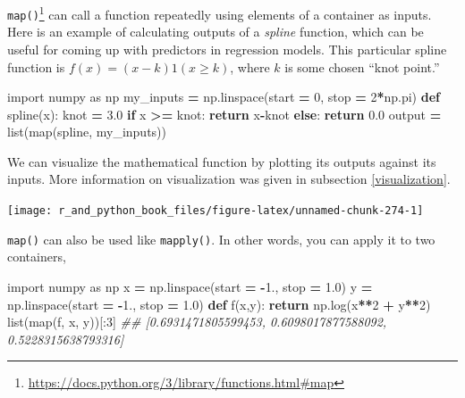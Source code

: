 \documentclass[
  12pt,
  krantz2]{krantz}
\makeatletter
\newenvironment{Shaded}{\begin{snugshade}}{\end{snugshade}}
\newcommand{\BuiltInTok}[1]{#1}
\newcommand{\CommentTok}[1]{\textcolor[rgb]{0.37,0.37,0.37}{\textit{#1}}}
\newcommand{\ControlFlowTok}[1]{\textcolor[rgb]{0.27,0.27,0.27}{\textbf{#1}}}
\newcommand{\DecValTok}[1]{\textcolor[rgb]{0.06,0.06,0.06}{#1}}
\newcommand{\FloatTok}[1]{\textcolor[rgb]{0.06,0.06,0.06}{#1}}
\newcommand{\ImportTok}[1]{#1}
\newcommand{\KeywordTok}[1]{\textcolor[rgb]{0.27,0.27,0.27}{\textbf{#1}}}
\newcommand{\NormalTok}[1]{#1}
\newcommand{\OperatorTok}[1]{\textcolor[rgb]{0.43,0.43,0.43}{\textbf{#1}}}
\renewcommand{\href}[2]{#2\footnote{\url{#1}}}
\newenvironment{kframe}{%
\medskip{}
\setlength{\fboxsep}{.8em}
 \def\at@end@of@kframe{}%
 \ifinner\ifhmode%
  \def\at@end@of@kframe{\end{minipage}}%
  \begin{minipage}{\columnwidth}%
 \fi\fi%
 \def\FrameCommand##1{\hskip\@totalleftmargin \hskip-\fboxsep
 \colorbox{shadecolor}{##1}\hskip-\fboxsep
     \hskip-\linewidth \hskip-\@totalleftmargin \hskip\columnwidth}%
 \MakeFramed {\advance\hsize-\width
   \@totalleftmargin\z@ \linewidth\hsize
   \@setminipage}}%
 {\par\unskip\endMakeFramed%
 \at@end@of@kframe}
\renewenvironment{Shaded}{\begin{kframe}}{\end{kframe}}
\makeatother
\begin{document}
\href{https://docs.python.org/3/library/functions.html\#map}{\texttt{map()}} can call a function repeatedly using elements of a container as inputs. Here is an example of calculating outputs of a \emph{spline} function, which can be useful for coming up with predictors in regression models. This particular spline function is \(f(x) = (x-k)1(x \ge k)\), where \(k\) is some chosen ``knot point.''

\begin{Shaded}
\begin{Highlighting}[]
\ImportTok{import}\NormalTok{ numpy }\ImportTok{as}\NormalTok{ np}
\NormalTok{my\_inputs }\OperatorTok{=}\NormalTok{ np.linspace(start }\OperatorTok{=} \DecValTok{0}\NormalTok{, stop }\OperatorTok{=} \DecValTok{2}\OperatorTok{*}\NormalTok{np.pi)}
\KeywordTok{def}\NormalTok{ spline(x):}
\NormalTok{    knot }\OperatorTok{=} \FloatTok{3.0}
    \ControlFlowTok{if}\NormalTok{ x }\OperatorTok{\textgreater{}=}\NormalTok{ knot:}
        \ControlFlowTok{return}\NormalTok{ x}\OperatorTok{{-}}\NormalTok{knot}
    \ControlFlowTok{else}\NormalTok{:}
        \ControlFlowTok{return} \FloatTok{0.0}
\NormalTok{output }\OperatorTok{=} \BuiltInTok{list}\NormalTok{(}\BuiltInTok{map}\NormalTok{(spline, my\_inputs))}
\end{Highlighting}
\end{Shaded}

We can visualize the mathematical function by plotting its outputs against its inputs. More information on visualization was given in subsection \ref{visualization}.

\texttt{[image: r\_and\_python\_book\_files/figure-latex/unnamed-chunk-274-1]}

\texttt{map()} can also be used like \texttt{mapply()}. In other words, you can apply it to two containers,

\begin{Shaded}
\begin{Highlighting}[]
\ImportTok{import}\NormalTok{ numpy }\ImportTok{as}\NormalTok{ np}
\NormalTok{x }\OperatorTok{=}\NormalTok{ np.linspace(start }\OperatorTok{=} \OperatorTok{{-}}\FloatTok{1.}\NormalTok{, stop }\OperatorTok{=} \FloatTok{1.0}\NormalTok{)}
\NormalTok{y }\OperatorTok{=}\NormalTok{ np.linspace(start }\OperatorTok{=} \OperatorTok{{-}}\FloatTok{1.}\NormalTok{, stop }\OperatorTok{=} \FloatTok{1.0}\NormalTok{)}
\KeywordTok{def}\NormalTok{ f(x,y):}
    \ControlFlowTok{return}\NormalTok{ np.log(x}\OperatorTok{**}\DecValTok{2} \OperatorTok{+}\NormalTok{ y}\OperatorTok{**}\DecValTok{2}\NormalTok{)}
\BuiltInTok{list}\NormalTok{(}\BuiltInTok{map}\NormalTok{(f, x, y))[:}\DecValTok{3}\NormalTok{]}
\CommentTok{\#\# [0.6931471805599453, 0.6098017877588092, 0.5228315638793316]}
\end{Highlighting}
\end{Shaded}
\end{document}
